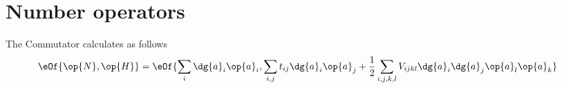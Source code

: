 \section{Number operators}
The Commutator calculates as follows
\begin{align}
	\eOf{\op{N},\op{H}} & = \eOf{\sum\limits_i \dg{a}_i \op{a}_i,\sum\limits_{i,j} t_{ij}\dg{a}_i \op{a}_j + \frac{1}{2}\sum\limits_{i,j,k,l}V_{ijkl}\dg{a}_i\dg{a}_j\op{a}_l\op{a}_k}
\end{align}